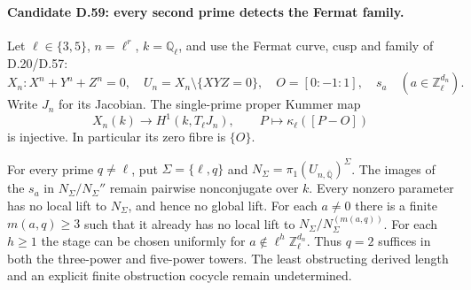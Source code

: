\paragraph{Candidate D.59: every second prime detects the Fermat family.}

Let $\ell\in\{3,5\}$, $n=\ell^r$, $k=\mathbb Q_\ell$,
and use the Fermat curve, cusp and family of D.20/D.57:
\[
 X_n:X^n+Y^n+Z^n=0,\quad
 U_n=X_n\setminus\{XYZ=0\},\quad O=[0:-1:1],\quad
 s_a\quad(a\in\mathbb Z_\ell^{d_n}).
\]
Write $J_n$ for its Jacobian.  The single-prime proper Kummer map
\[
 X_n(k)\longrightarrow H^1(k,T_\ell J_n),\qquad
                   P\longmapsto\kappa_\ell([P-O])       \tag{D.59.1}
\]
is injective.  In particular its zero fibre is $\{O\}$.

For every prime $q\ne\ell$, put $\Sigma=\{\ell,q\}$ and
$N_\Sigma=\pi_1(U_{n,\overline{\mathbb Q}})^\Sigma$.
The images of the $s_a$ in $N_\Sigma/N_\Sigma''$ remain
pairwise nonconjugate over $k$.  Every nonzero parameter
has no local lift to $N_\Sigma$, and hence no global lift.
For each $a\ne0$ there is a finite $m(a,q)\ge3$ such that
it already has no local lift to
$N_\Sigma/N_\Sigma^{(m(a,q))}$.  For each $h\ge1$ the
stage can be chosen uniformly for
$a\notin\ell^h\mathbb Z_\ell^{d_n}$.
Thus $q=2$ suffices in both the three-power and five-power
towers.  The least obstructing derived length and an
explicit finite obstruction cocycle remain undetermined.

